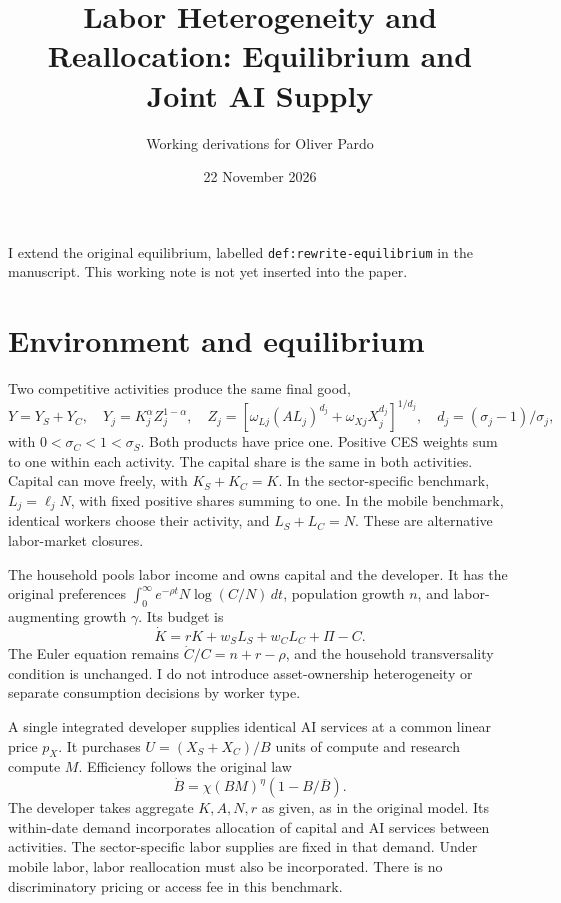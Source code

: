 \documentclass[11pt]{article}
\title{Labor Heterogeneity and Reallocation: Equilibrium and Joint AI Supply}
\author{Working derivations for Oliver Pardo}
\date{22 November 2026}
\begin{document}
\maketitle
I extend the original equilibrium, labelled \texttt{def:rewrite-equilibrium}
in the manuscript. This working note is not yet inserted into the paper.

\section{Environment and equilibrium}
Two competitive activities produce the same final good,
\begin{equation}
 Y=Y_S+Y_C,\quad Y_j=K_j^\alpha Z_j^{1-\alpha},\quad
 Z_j=[\omega_{Lj}(AL_j)^{d_j}+\omega_{Xj}X_j^{d_j}]^{1/d_j},\quad
 d_j=(\sigma_j-1)/\sigma_j,
 \label{eq:extension-production}
\end{equation}
with $0<\sigma_C<1<\sigma_S$. Both products have price one.
Positive CES weights sum to one within each activity. The capital share is
the same in both activities. Capital can move freely, with $K_S+K_C=K$.
In the sector-specific benchmark, $L_j=\ell_jN$, with fixed positive shares
summing to one. In the mobile benchmark, identical workers choose their
activity, and $L_S+L_C=N$. These are alternative labor-market closures.

The household pools labor income and owns capital and the developer. It has
the original preferences $\int_0^\infty e^{-\rho t}N\log(C/N)\,dt$,
population growth $n$, and labor-augmenting growth $\gamma$. Its budget is
\[
 \dot K=rK+w_SL_S+w_CL_C+\Pi-C.
\]
The Euler equation remains $\dot C/C=n+r-\rho$, and the household
transversality condition is unchanged. I do not introduce asset-ownership
heterogeneity or separate consumption decisions by worker type.

A single integrated developer supplies identical AI services at a common
linear price $p_X$. It purchases $U=(X_S+X_C)/B$ units of compute and
research compute $M$. Efficiency follows the original law
\[
 \dot B=\chi(BM)^\eta(1-B/\overline B).
\]
The developer takes aggregate $K,A,N,r$ as given, as in the original model.
Its within-date demand incorporates allocation of capital and AI services
between activities. The sector-specific labor supplies are fixed in that
demand. Under mobile labor, labor reallocation must also be incorporated.
There is no discriminatory pricing or access fee in this benchmark.
\end{document}

